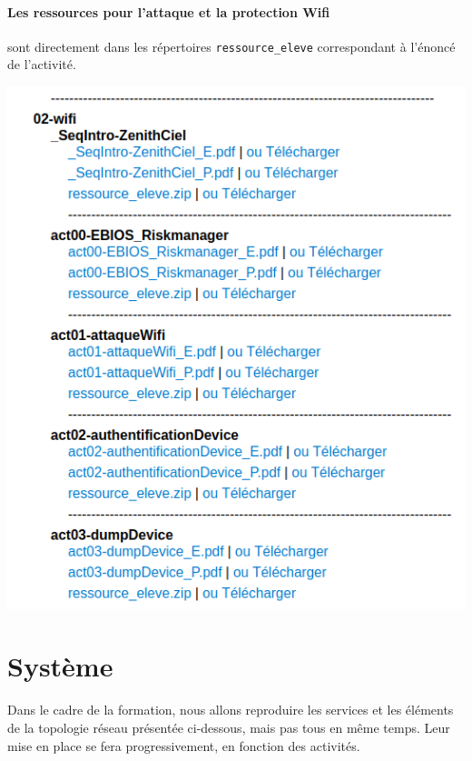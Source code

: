 \documentclass[french, 12pt]{article}%
\begin{document}
\begin{minipage}{0.49\linewidth}
\paragraph{Les ressources pour l'attaque et la protection Wifi} sont directement dans les répertoires \verb?ressource_eleve? correspondant à l'énoncé de l'activité. 

\end{minipage}
\begin{minipage}{0.49\linewidth}
\begin{center}
\includegraphics[scale=0.4]{./ressource/ressourceEleve}
\end{center}
\end{minipage}





\section{Système} 

Dans le cadre de la formation, nous allons reproduire les services et les éléments de la topologie réseau présentée ci-dessous, mais pas tous en même temps. Leur mise en place se fera progressivement, en fonction des activités.
\end{document}
